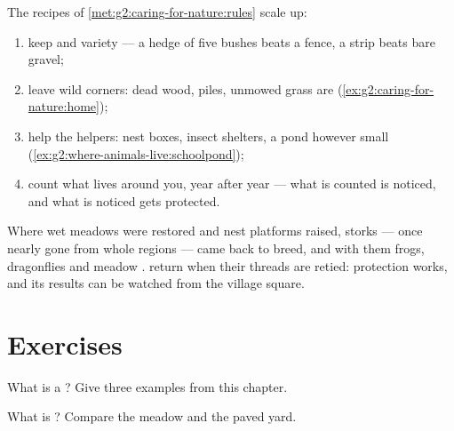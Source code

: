 \begin{method}\label{met:g5:biodiversity:help}
The recipes of \cref{met:g2:caring-for-nature:rules} scale
up:
\begin{enumerate}
  \item keep and  variety --- a hedge of five bushes
        beats a fence, a  strip beats bare gravel;
  \item leave wild corners: dead wood,  piles, unmowed
        grass are 
        (\cref{ex:g2:caring-for-nature:home});
  \item help the helpers: nest boxes, insect shelters, a
        pond however small
        (\cref{ex:g2:where-animals-live:schoolpond});
  \item count what lives around you, year after year ---
        what is counted is noticed, and what is noticed gets
        protected.
\end{enumerate}
\end{method}

\begin{example}\label{ex:g5:biodiversity:storks}
Where wet meadows were restored and nest platforms raised,
storks --- once nearly gone from whole regions --- came back
to breed, and with them frogs, dragonflies and meadow
.  return when their threads are retied:
protection works, and its results can be watched from the
village square.
\end{example}

\section{Exercises}

\begin{exercise}[$\star$]\label{exo:g5:biodiversity:1}
What is a ? Give three examples from this chapter.
\end{exercise}

\begin{exercise}[$\star$]\label{exo:g5:biodiversity:2}
What is ? Compare the meadow and the paved yard.
\end{exercise}

